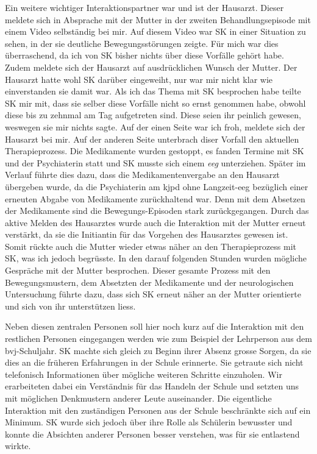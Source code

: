 Ein weitere wichtiger Interaktionspartner war und ist der Hausarzt. Dieser meldete sich in Absprache mit der Mutter in der zweiten Behandlungsepisode mit einem Video selbständig bei mir. Auf diesem Video war SK in einer Situation zu sehen, in der sie deutliche Bewegungsstörungen zeigte. Für mich war dies überraschend, da ich von SK bisher nichts über diese Vorfälle gehört habe. Zudem meldete sich der Hausarzt auf ausdrücklichen Wunsch der Mutter. Der Hausarzt hatte wohl SK darüber eingeweiht, nur war mir nicht klar wie einverstanden sie damit war. Als ich das Thema mit SK besprochen habe teilte SK mir mit, dass sie selber diese Vorfälle nicht so ernst genommen habe, obwohl diese bis zu zehnmal am Tag aufgetreten sind. Diese seien ihr peinlich gewesen, weswegen sie mir nichts sagte. Auf der einen Seite war ich froh, meldete sich der Hausarzt bei mir. Auf der anderen Seite unterbrach diser Vorfall den aktuellen Therapieprozess. Die Medikamente wurden gestoppt, es fanden Termine mit SK und der Psychiaterin statt und SK musste sich einem \textit{\ac{eeg}} unterziehen. Später im Verlauf führte dies dazu, dass die Medikamentenvergabe an den Hausarzt übergeben wurde, da die Psychiaterin am \ac{kjpd} ohne Langzeit-\ac{eeg} bezüglich einer erneuten Abgabe von Medikamente zurückhaltend war. Denn mit dem Absetzen der Medikamente sind die Bewegungs-Episoden stark zurückgegangen. Durch das aktive Melden des Hausarztes wurde auch die Interaktion mit der Mutter erneut verstärkt, da sie die Initiantin für das Vorgehen des Hausarztes gewesen ist. Somit rückte auch die Mutter wieder etwas näher an den Therapieprozess mit SK, was ich jedoch begrüsste. In den darauf folgenden Stunden wurden mögliche Gespräche mit der Mutter besprochen. Dieser gesamte Prozess mit den Bewegungsmustern, dem Absetzten der Medikamente und der neurologischen Untersuchung führte dazu, dass sich SK erneut näher an der Mutter orientierte und sich von ihr unterstützen liess.

Neben diesen zentralen Personen soll hier noch kurz auf die Interaktion mit den restlichen Personen eingegangen werden wie zum Beispiel der Lehrperson aus dem \ac{bvj}-Schuljahr. SK machte sich gleich zu Beginn ihrer Absenz grosse Sorgen, da sie dies an die früheren Erfahrungen in der Schule erinnerte. Sie getraute sich nicht telefonisch Informationen über mögliche weiteren Schritte einzuholen. Wir erarbeiteten dabei ein Verständnis für das Handeln der Schule und setzten uns mit möglichen Denkmustern anderer Leute auseinander. Die eigentliche Interaktion mit den zuständigen Personen aus der Schule beschränkte sich auf ein Minimum. SK wurde sich jedoch über ihre Rolle als Schülerin bewusster und konnte die Absichten anderer Personen besser verstehen, was für sie entlastend wirkte. 


